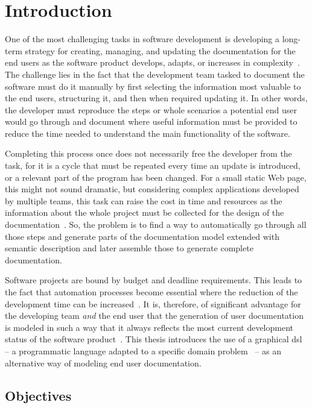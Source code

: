 \chapter{Introduction}\label{ch:intro}

One of the most challenging tasks in software development is developing a long-term strategy for creating, managing, and updating the documentation for the end users as the software product develops, adapts, or increases in complexity~\cite{ieee6081814}. The challenge lies in the fact that the development team tasked to document the software must do it manually by first selecting the information most valuable to the end users, structuring it, and then when required updating it. In other words, the developer must reproduce the steps or whole scenarios a potential end user would go through and document where useful information must be provided to reduce the time needed to understand the main functionality of the software. 

Completing this process once does not necessarily free the developer from the task, for it is a cycle that must be repeated every time an update is introduced, or a relevant part of the program has been changed. For a small static Web page, this might not sound dramatic, but considering complex applications developed by multiple teams, this task can raise the cost in time and resources as the information about the whole project must be collected for the design of the documentation~\cite{ieee5712775}. So, the problem is to find a way to automatically go through all those steps and generate parts of the documentation model extended with semantic description and later assemble those to generate complete documentation.

Software projects are bound by budget and deadline requirements. This leads to the fact that automation processes become essential where the reduction of the development time can be increased~\cite{despa2014comparative}. It is, therefore, of significant advantage for the developing team \textit{and} the end user that the generation of user documentation is modeled in such a way that it always reflects the most current development status of the software product~\cite{waits_et_al}. This thesis introduces the use of a graphical \gls{dsl} -- a programmatic language adapted to a specific domain problem~\cite{perez-et_al} -- as an alternative way of modeling end user documentation.

\section{Objectives}\label{sec:objectives}


